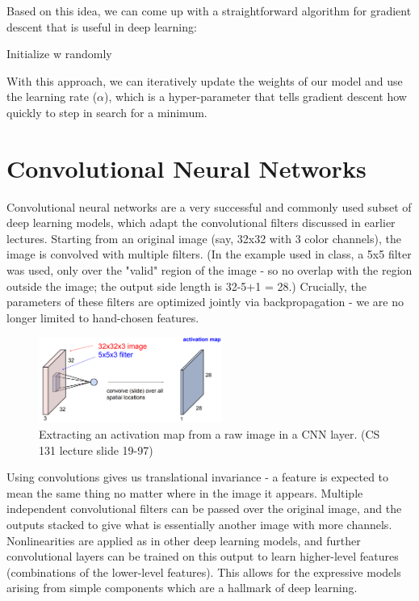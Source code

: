 \documentclass{article}
\begin{document}
Based on this idea, we can come up with a straightforward algorithm for gradient descent that is useful in deep learning:

\begin{algorithm}[H]
Initialize w randomly \\
\end{algorithm}

With this approach, we can iteratively update the weights of our model and use the learning rate ($\alpha$), which is a hyper-parameter that tells gradient descent how quickly to step in search for a minimum.



\section{Convolutional Neural Networks}
Convolutional neural networks are a very successful and commonly used subset of deep learning models, which adapt the convolutional filters discussed in earlier lectures. Starting from an original image (say, 32x32 with 3 color channels), the image is convolved with multiple filters. (In the example used in class, a 5x5 filter was used, only over the "valid" region of the image - so no overlap with the region outside the image; the output side length is 32-5+1 = 28.) Crucially, the parameters of these filters are optimized jointly via backpropagation - we are no longer limited to hand-chosen features.

\begin{figure}[h]
\includegraphics[width=6cm]{Activation_map.png}
\centering
\caption{Extracting an activation map from a raw image in a CNN layer. (CS 131 lecture slide 19-97)}
\end{figure}

 Using convolutions gives us translational invariance - a feature is expected to mean the same thing no matter where in the image it appears. Multiple independent convolutional filters can be passed over the original image, and the outputs stacked to give what is essentially another image with more channels. Nonlinearities are applied as in other deep learning models, and further convolutional layers can be trained on this output to learn higher-level features (combinations of the lower-level features). This allows for the expressive models arising from simple components which are a hallmark of deep learning.
 
\end{document}
